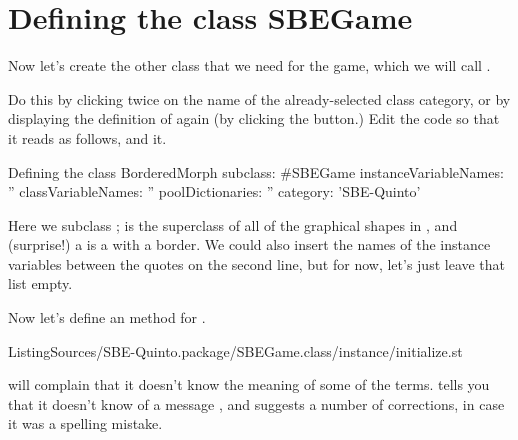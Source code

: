 \documentclass[a4paper,10pt,twoside]{book}
\begin{document}


\section{Defining the class SBEGame}

Now let's create the other class that we need for the game, which we will call .

Do this by clicking twice on the name of the already-selected class category, or by displaying the definition of  again (by clicking the  button.)
Edit the code so that it reads as follows, and  it.

\begin{classdef}[sbegame]{Defining the  class}
BorderedMorph subclass: #SBEGame
   instanceVariableNames: ''
   classVariableNames: ''
   poolDictionaries: ''
   category: 'SBE-Quinto'
\end{classdef}

Here we subclass ;  is the superclass of all of the graphical shapes in \squeak, and (surprise!) a  is a  with a border.
We could also insert the names of the instance variables between the quotes on the second line, but for now, let's just leave that list empty.

Now let's define an  method for .


%
{ListingSources/SBE-Quinto.package/SBEGame.class/instance/initialize.st}


\squeak will complain that it doesn't know the meaning of some of the terms.
\squeak tells you that it doesn't know of a message , and suggests a number of corrections, in case it was a spelling mistake.
\end{document}
